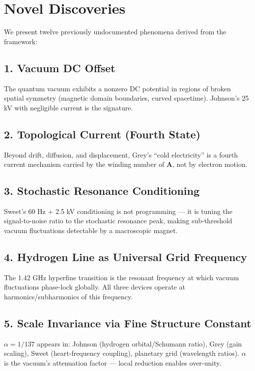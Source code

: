 \documentclass[11pt, twocolumn]{article}
\begin{document}
\section{Novel Discoveries}
\label{sec:discoveries}

We present twelve previously undocumented phenomena derived from the framework:

\subsection*{1. Vacuum DC Offset}
The quantum vacuum exhibits a nonzero DC potential in regions of broken spatial symmetry (magnetic domain boundaries, curved spacetime). Johnson's 25 kV with negligible current is the signature.

\subsection*{2. Topological Current (Fourth State)}
Beyond drift, diffusion, and displacement, Grey's ``cold electricity'' is a fourth current mechanism carried by the winding number of $\mathbf{A}$, not by electron motion.

\subsection*{3. Stochastic Resonance Conditioning}
Sweet's 60 Hz + 2.5 kV conditioning is not programming --- it is tuning the signal-to-noise ratio to the stochastic resonance peak, making sub-threshold vacuum fluctuations detectable by a macroscopic magnet.

\subsection*{4. Hydrogen Line as Universal Grid Frequency}
The 1.42 GHz hyperfine transition is the resonant frequency at which vacuum fluctuations phase-lock globally. All three devices operate at harmonics/subharmonics of this frequency.

\subsection*{5. Scale Invariance via Fine Structure Constant}
$\alpha = 1/137$ appears in: Johnson (hydrogen orbital/Schumann ratio), Grey (gain scaling), Sweet (heart-frequency coupling), planetary grid (wavelength ratios). $\alpha$ is the vacuum's attenuation factor --- local reduction enables over-unity.
\end{document}
